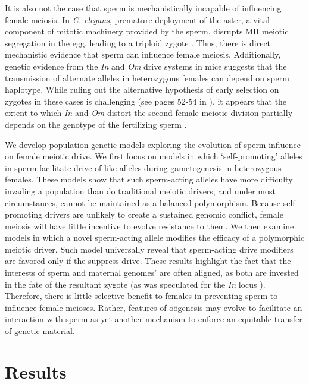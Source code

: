 \documentclass{pnastwo}
\begin{document}
\begin{article}
It is also not the case that sperm is mechanistically incapable of influencing female meiosis.
In \emph{C. elegans}, premature deployment of the aster, a vital component of mitotic
machinery provided by the sperm, disrupts MII meiotic segregation
in the egg, leading to a triploid zygote \cite{McNally2012}. 
Thus, there is direct mechanistic evidence that sperm can influence female meiosis.
 Additionally, genetic evidence from the \emph{In} and \emph{Om}  drive systems in mice suggests that the 
 transmission of alternate alleles in heterozygous females can depend on sperm haplotype.  
 While ruling out the alternative hypothesis of early selection on zygotes in these cases is challenging (see pages 52-54 in \cite{Burt2006}), it appears that the extent to which \emph{In} and \emph{Om} distort the second female meiotic division partially depends on the genotype of the fertilizing sperm \cite{Agulnik1993,Wu2005}.  


We develop population genetic models exploring the evolution of sperm influence on female meiotic drive. 
We first focus on models in which `self-promoting' alleles in
  sperm facilitate drive of like alleles during gametogenesis in heterozygous females. 
These models show that such sperm-acting alleles 
	have more difficulty invading a population than do traditional meiotic drivers, 
	 and under most circumstances, cannot be maintained as a balanced polymorphism.
Because self-promoting drivers are unlikely to create a sustained genomic conflict, 
	female meiosis will have little incentive to evolve resistance to them.
We then examine models in which a novel sperm-acting allele modifies the efficacy of a polymorphic meiotic driver. 
Such model universally reveal that sperm-acting drive modifiers are favored only if the suppress drive. 
These results highlight the fact that the interests of sperm and maternal  genomes' are often aligned, as both are invested in the fate of the resultant zygote (as was speculated for the \emph{In} locus \cite{Pomiankowski1993}).
Therefore, there is little selective benefit to females in preventing sperm to influence female meioses.
Rather, features of o\"{o}genesis  may evolve to facilitate an interaction with sperm
	as yet another mechanism to enforce an equitable transfer of genetic material.


\section{Results}

\end{article}
\end{document}
